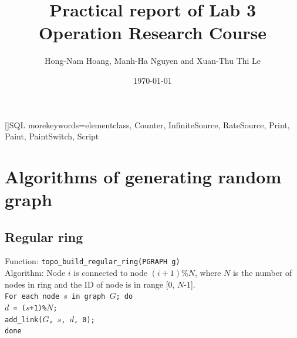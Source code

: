 \documentclass[a4paper]{article}
\title{Practical report of Lab 3 \\
Operation Research Course}
\author{Hong-Nam Hoang, Manh-Ha Nguyen and Xuan-Thu Thi Le}
\date{\today}
\begin{document}
  \maketitle


  []{SQL}{
    morekeywords={elementclass, Counter, InfiniteSource, RateSource, Print, Paint, PaintSwitch, Script}}

  \section{Algorithms of generating random graph}
  \subsection{Regular ring}
  Function: \texttt{topo\_build\_regular\_ring(PGRAPH g)} \\
  Algorithm: Node $i$ is connected to node $(i+1)\%N$, where $N$ is the number of nodes in ring and the ID of node is in range [0, $N$-1]. \\
    \texttt{For each node $s$ in graph $G$; do \\
      $d$ = ($s$+1)\%$N$; \\
      add\_link($G$, $s$, $d$, 0); \\
      done}
\end{document}

